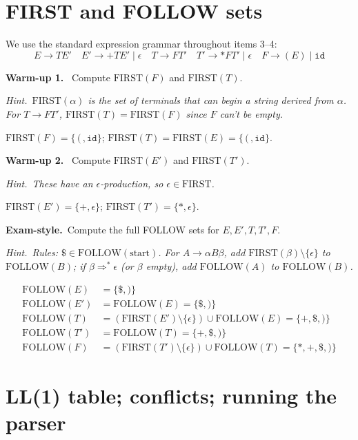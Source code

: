 \documentclass[11pt,a4paper]{article}
\newcommand{\hint}[1]{\par{\small\textcolor{accent}{\textit{Hint.}}\ \textit{#1}}\par\smallskip}
\newcommand{\warm}[1]{\smallskip\textbf{\textcolor{hi}{Warm-up #1.}}\ }
\newcommand{\exam}{\smallskip\textbf{\textcolor{warn}{Exam-style.}}\ }
\begin{document}
\section{FIRST and FOLLOW sets}

We use the standard expression grammar throughout items 3--4:
\[
E\to TE' \quad E'\to{+}TE'\mid\epsilon \quad T\to FT' \quad T'\to{*}FT'\mid\epsilon \quad F\to(E)\mid \texttt{id}
\]

\warm{1} Compute $\mathrm{FIRST}(F)$ and $\mathrm{FIRST}(T)$.
\hint{$\mathrm{FIRST}(\alpha)$ is the set of terminals that can begin a string derived from $\alpha$. For $T\to FT'$, $\mathrm{FIRST}(T)=\mathrm{FIRST}(F)$ since $F$ can't be empty.}
\begin{sol}
$\mathrm{FIRST}(F)=\{\,(\,,\texttt{id}\}$; $\mathrm{FIRST}(T)=\mathrm{FIRST}(E)=\{\,(\,,\texttt{id}\}$.
\end{sol}

\warm{2} Compute $\mathrm{FIRST}(E')$ and $\mathrm{FIRST}(T')$.
\hint{These have an $\epsilon$-production, so $\epsilon\in\mathrm{FIRST}$.}
\begin{sol}
$\mathrm{FIRST}(E')=\{+,\epsilon\}$; $\mathrm{FIRST}(T')=\{*,\epsilon\}$.
\end{sol}

\exam Compute the full FOLLOW sets for $E,E',T,T',F$.
\hint{Rules: $\$\in\mathrm{FOLLOW}(\text{start})$. For $A\to\alpha B\beta$, add $\mathrm{FIRST}(\beta)\setminus\{\epsilon\}$ to $\mathrm{FOLLOW}(B)$; if $\beta\Rightarrow^*\epsilon$ (or $\beta$ empty), add $\mathrm{FOLLOW}(A)$ to $\mathrm{FOLLOW}(B)$.}
\begin{sol}
\[
\begin{aligned}
\mathrm{FOLLOW}(E)&=\{\$,)\}\\
\mathrm{FOLLOW}(E')&=\mathrm{FOLLOW}(E)=\{\$,)\}\\
\mathrm{FOLLOW}(T)&=(\mathrm{FIRST}(E')\setminus\{\epsilon\})\cup\mathrm{FOLLOW}(E)=\{+,\$,)\}\\
\mathrm{FOLLOW}(T')&=\mathrm{FOLLOW}(T)=\{+,\$,)\}\\
\mathrm{FOLLOW}(F)&=(\mathrm{FIRST}(T')\setminus\{\epsilon\})\cup\mathrm{FOLLOW}(T)=\{*,+,\$,)\}
\end{aligned}
\]
\end{sol}

\section{LL(1) table; conflicts; running the parser}
\end{document}
